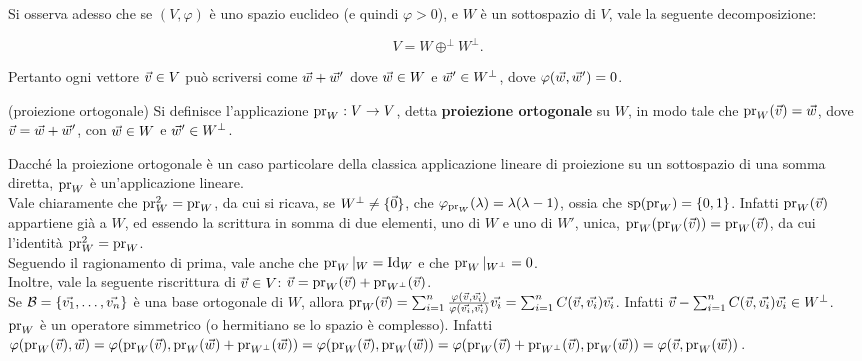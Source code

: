 \begin{remark}
	Si osserva adesso che se $(V, \varphi)$ è uno spazio euclideo (e quindi $\varphi > 0$), e $W$ è
	un sottospazio di $V$, vale la seguente decomposizione:
	
	\[ V = W \oplus^\perp W^\perp. \]
	
	Pertanto ogni vettore $\v \in V$ può scriversi come $\w + \w'$ dove $\w \in W$ e $\w' \in W^\perp$,
	dove $\varphi(\w, \w') = 0$.
\end{remark}

\begin{definition} (proiezione ortogonale)
	Si definisce l'applicazione $\operatorname{pr}_W : V \to V$, detta \textbf{proiezione ortogonale} su $W$,
	in modo tale che $\pr_W(\v) = \w$, dove $\v = \w + \w'$, con $\w \in W$ e $\w' \in W^\perp$.
\end{definition}

\begin{remark}\nl
	\li Dacché la proiezione ortogonale è un caso particolare della classica applicazione lineare
	di proiezione su un sottospazio di una somma diretta, $\operatorname{pr}_W$ è un'applicazione lineare. \\
	\li Vale chiaramente che $\operatorname{pr}_W^2 = \operatorname{pr}_W$, da cui si ricava, se $W^\perp \neq \zerovecset$, che
	$\varphi_{\operatorname{pr}_W}(\lambda) = \lambda (\lambda -1)$, ossia che $\operatorname{sp}(\operatorname{pr}_W) = \{0, 1\}$. Infatti
	$\pr_W(\v)$ appartiene già a $W$, ed essendo la scrittura in somma di due elementi, uno di $W$ e
	uno di $W'$, unica, $\pr_W(\pr_W(\v)) = \pr_W(\v)$, da cui l'identità $\operatorname{pr}_W^2 = \operatorname{pr}_W$. \\
	\li Seguendo il ragionamento di prima, vale anche che $\operatorname{pr}_W\arrowvert_{W} = \operatorname{Id}_W$ e che
	$\operatorname{pr}_W\arrowvert_{W^\perp} = 0$. \\
	\li Inoltre, vale la seguente riscrittura di $\v \in V$: $\v = \pr_W(\v) + \pr_{W^\perp}(\v)$. \\
	\li Se $\basis = \{ \vv1, \ldots, \vv n \}$ è una base ortogonale di $W$, allora
	$\pr_W(\v) = \sum_{i=1}^n \frac{\varphi(\v, \vv i)}{\varphi(\vv i, \vv i)} \vv i = \sum_{i=1}^n C(\v, \vv i) \vv i$. Infatti $\v -\sum_{i=1}^n C(\v, \vv i) \vv i \in W^\perp$. \\
	\li $\operatorname{pr}_W$ è un operatore simmetrico (o hermitiano se lo spazio è complesso). Infatti $\varphi(\pr_W(\v), \w) =
	\varphi(\pr_W(\v), \pr_W(\w) + \pr_{W^\perp}(\w)) = \varphi(\pr_W(\v), \pr_W(\w)) = \varphi(\pr_W(\v) + \pr_{W^\perp}(\v), \pr_W(\w)) = \varphi(\v, \pr_W(\w))$.
\end{remark}

